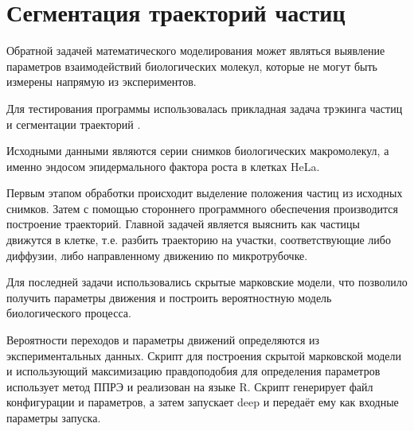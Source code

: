 \section*{Сегментация траекторий частиц}

Обратной задачей математического моделирования
может являться выявление параметров взаимодействий биологических молекул,
которые не могут быть измерены напрямую из экспериментов.

Для тестирования программы использовалась
прикладная задача трэкинга частиц
и сегментации траекторий \cite{track}.

Исходными данными являются
серии снимков биологических макромолекул,
а именно эндосом эпидермального фактора роста
в клетках HeLa.

Первым этапом обработки происходит выделение
положения частиц из исходных снимков.
Затем с помощью стороннего программного обеспечения
производится построение траекторий.
Главной задачей является выяснить
как частицы движутся в клетке,
т.е. разбить траекторию на участки,
соответствующие либо диффузии,
либо направленному движению по микротрубочке.

Для последней задачи использовались
скрытые марковские модели,
что позволило получить
параметры движения и
построить вероятностную модель
биологического процесса.

Вероятности переходов и параметры движений
определяются из экспериментальных данных.
Скрипт для построения скрытой марковской модели
и использующий максимизацию правдоподобия
для определения параметров использует
метод ППРЭ и реализован на языке R.
Скрипт генерирует файл конфигурации и параметров,
а затем запускает deep и передаёт ему
как входные параметры запуска.

